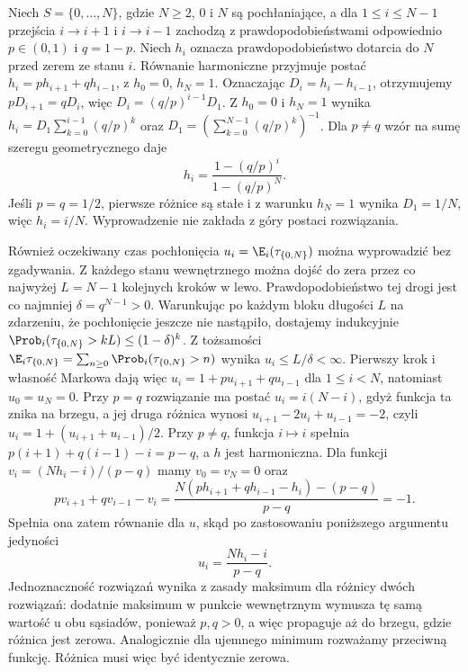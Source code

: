 \begin{przyklad}
Niech $S=\{0,\ldots,N\}$, gdzie $N\geq2$,
$0$ i $N$ są pochłaniające,
a dla $1\leq i\leq N-1$
przejścia $i\to i+1$ i $i\to i-1$ zachodzą
z prawdopodobieństwami odpowiednio $p\in(0,1)$
i $q=1-p$. Niech $h_i$ oznacza prawdopodobieństwo
dotarcia do $N$ przed zerem ze stanu $i$.
Równanie harmoniczne przyjmuje postać
$h_i=ph_{i+1}+qh_{i-1}$, z $h_0=0$, $h_N=1$.
Oznaczając $D_i=h_i-h_{i-1}$, otrzymujemy
$pD_{i+1}=qD_i$, więc $D_i=(q/p)^{i-1}D_1$.
Z $h_0=0$ i $h_N=1$ wynika
$h_i=D_1\sum_{k=0}^{i-1}(q/p)^k$ oraz
$D_1=(\sum_{k=0}^{N-1}(q/p)^k)^{-1}$.
Dla $p\ne q$ wzór na sumę szeregu geometrycznego daje
\[
h_i=\frac{1-(q/p)^i}{1-(q/p)^N}.
\]
Jeśli $p=q=1/2$, pierwsze różnice są stałe
i z warunku $h_N=1$ wynika $D_1=1/N$,
więc $h_i=i/N$. Wyprowadzenie nie zakłada
z góry postaci rozwiązania.

Również oczekiwany czas pochłonięcia
$u_i=\E_i(\tau_{\{0,N\}})$ można wyprowadzić
bez zgadywania. Z każdego stanu wewnętrznego
można dojść do zera przez co najwyżej $L=N-1$
kolejnych kroków w lewo. Prawdopodobieństwo tej
drogi jest co najmniej $\delta=q^{N-1}>0$.
Warunkując po każdym bloku długości $L$ na
zdarzeniu, że pochłonięcie jeszcze nie nastąpiło,
dostajemy indukcyjnie
$\Prob_i(\tau_{\{0,N\}}>kL)\leq(1-\delta)^k$.
Z tożsamości $\E_i\tau_{\{0,N\}}=
\sum_{n\geq0}\Prob_i(\tau_{\{0,N\}}>n)$ wynika
$u_i\leq L/\delta<\infty$.
Pierwszy krok i własność Markowa dają więc
$u_i=1+pu_{i+1}+qu_{i-1}$ dla $1\leq i<N$,
natomiast $u_0=u_N=0$. Przy $p=q$ rozwiązanie ma postać
$u_i=i(N-i)$, gdyż funkcja ta znika na brzegu,
a jej druga różnica wynosi
$u_{i+1}-2u_i+u_{i-1}=-2$, czyli
$u_i=1+(u_{i+1}+u_{i-1})/2$. Przy $p\ne q$, funkcja $i\mapsto i$
spełnia $p(i+1)+q(i-1)-i=p-q$,
a $h$ jest harmoniczna. Dla funkcji
$v_i=(Nh_i-i)/(p-q)$ mamy $v_0=v_N=0$ oraz
\[
pv_{i+1}+qv_{i-1}-v_i
=\frac{N(ph_{i+1}+qh_{i-1}-h_i)-(p-q)}{p-q}
=-1.
\]
Spełnia ona zatem równanie dla $u$, skąd
po zastosowaniu poniższego argumentu jedyności
\[
u_i=\frac{Nh_i-i}{p-q}.
\]
Jednoznaczność rozwiązań wynika z zasady maksimum
dla różnicy dwóch rozwiązań: dodatnie maksimum
w punkcie wewnętrznym wymusza tę samą wartość
u obu sąsiadów, ponieważ $p,q>0$, a więc
propaguje aż do brzegu, gdzie różnica jest zerowa.
Analogicznie dla ujemnego minimum rozważamy
przeciwną funkcję. Różnica musi więc być identycznie
zerowa.
\end{przyklad}

